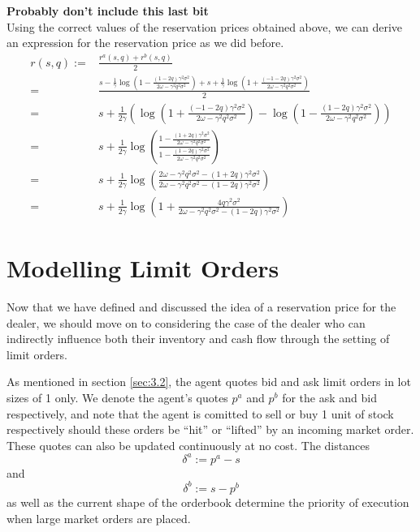 \textbf{Probably don't include this last bit}\\
Using the correct values of the reservation prices obtained above, we can derive an
expression for the reservation price as we did before.
\begin{align*}
    r(s,q):=&\frac{r^a(s,q)+r^b(s,q)}{2}\\
    =&\frac{s-\frac{1}{\gamma}\log\left(1-\frac{(1-2q)\gamma^2\sigma^2}{2\omega-\gamma^2q^2\sigma^2}\right)+s+\frac{1}{\gamma}\log\left(1+\frac{(-1-2q)\gamma^2\sigma^2}{2\omega-\gamma^2q^2\sigma^2}\right)}{2}\\
    =&s+\frac{1}{2\gamma}\left(\log\left(1+\frac{(-1-2q)\gamma^2\sigma^2}{2\omega-\gamma^2q^2\sigma^2}\right)-\log\left(1-\frac{(1-2q)\gamma^2\sigma^2}{2\omega-\gamma^2q^2\sigma^2}\right)\right)\\
    =&s+\frac{1}{2\gamma}\log\left(\frac{1-\frac{(1+2q)\gamma^2\sigma^2}{2\omega-\gamma^2q^2\sigma^2}}{1-\frac{(1-2q)\gamma^2\sigma^2}{2\omega-\gamma^2q^2\sigma^2}}\right)\\
    =&s+\frac{1}{2\gamma}\log\left(\frac{2\omega-\gamma^2q^2\sigma^2-(1+2q)\gamma^2\sigma^2}{2\omega-\gamma^2q^2\sigma^2-(1-2q)\gamma^2\sigma^2}\right)\\
    =&s+\frac{1}{2\gamma}\log\left(1+\frac{4q\gamma^2\sigma^2}{2\omega-\gamma^2q^2\sigma^2-(1-2q)\gamma^2\sigma^2}\right)
\end{align*}

\section{Modelling Limit Orders}\label{sec:3.5}
Now that we have defined and discussed the idea of a reservation price
for the dealer, we should move on to considering the case of the dealer
who can indirectly influence both their inventory and cash flow through
the setting of limit orders. 

As mentioned in section \ref{sec:3.2},
the agent quotes bid and ask limit orders in lot sizes of 1 only.
We denote the agent's quotes $p^a$ and $p^b$ for the ask and bid respectively,
and note that the agent is comitted to sell or buy 1 unit of stock respectively
should these orders be ``hit'' or ``lifted'' by an incoming market order.
These quotes can also be updated continuously at no cost. The distances
\begin{equation}
    \delta^a:=p^a-s
\end{equation}
and 
\begin{equation}
    \delta^b:=s-p^b
\end{equation}
as well as the current shape of the orderbook determine the priority 
of execution when large market orders are placed. 

